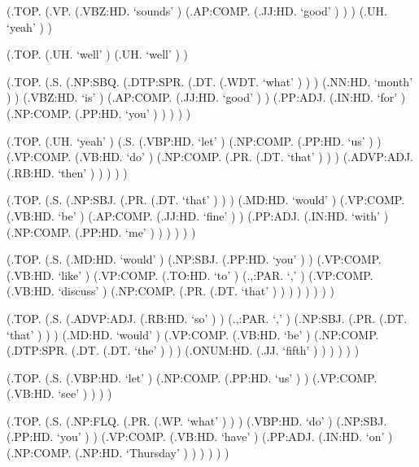 \documentclass[10pt]{article}
\begin{document}
\begin{parsetree}  (.TOP. (.VP. (.VBZ:HD. `sounds' ) (.AP:COMP. (.JJ:HD. `good' ) ) ) (.UH. `yeah' ) ) \end{parsetree}

\begin{parsetree}  (.TOP. (.UH. `well' ) (.UH. `well' ) ) \end{parsetree}

\begin{parsetree}  (.TOP. (.S. (.NP:SBQ. (.DTP:SPR. (.DT. (.WDT. `what' ) ) ) (.NN:HD. `month' ) ) (.VBZ:HD. `is' ) (.AP:COMP. (.JJ:HD. `good' ) ) (.PP:ADJ. (.IN:HD. `for' ) (.NP:COMP. (.PP:HD. `you' ) ) ) ) ) \end{parsetree}

\begin{parsetree}  (.TOP. (.UH. `yeah' ) (.S. (.VBP:HD. `let' ) (.NP:COMP. (.PP:HD. `us' ) ) (.VP:COMP. (.VB:HD. `do' ) (.NP:COMP. (.PR. (.DT. `that' ) ) ) (.ADVP:ADJ. (.RB:HD. `then' ) ) ) ) ) \end{parsetree}

\begin{parsetree}  (.TOP. (.S. (.NP:SBJ. (.PR. (.DT. `that' ) ) ) (.MD:HD. `would' ) (.VP:COMP. (.VB:HD. `be' ) (.AP:COMP. (.JJ:HD. `fine' ) ) (.PP:ADJ. (.IN:HD. `with' ) (.NP:COMP. (.PP:HD. `me' ) ) ) ) ) ) \end{parsetree}

\begin{parsetree}  (.TOP. (.S. (.MD:HD. `would' ) (.NP:SBJ. (.PP:HD. `you' ) ) (.VP:COMP. (.VB:HD. `like' ) (.VP:COMP. (.TO:HD. `to' ) (.,:PAR. `,' ) (.VP:COMP. (.VB:HD. `discuss' ) (.NP:COMP. (.PR. (.DT. `that' ) ) ) ) ) ) ) ) \end{parsetree}

\begin{parsetree}  (.TOP. (.S. (.ADVP:ADJ. (.RB:HD. `so' ) ) (.,:PAR. `,' ) (.NP:SBJ. (.PR. (.DT. `that' ) ) ) (.MD:HD. `would' ) (.VP:COMP. (.VB:HD. `be' ) (.NP:COMP. (.DTP:SPR. (.DT. (.DT. `the' ) ) ) (.ONUM:HD. (.JJ. `fifth' ) ) ) ) ) ) \end{parsetree}

\begin{parsetree}  (.TOP. (.S. (.VBP:HD. `let' ) (.NP:COMP. (.PP:HD. `us' ) ) (.VP:COMP. (.VB:HD. `see' ) ) ) ) \end{parsetree}

\begin{parsetree}  (.TOP. (.S. (.NP:FLQ. (.PR. (.WP. `what' ) ) ) (.VBP:HD. `do' ) (.NP:SBJ. (.PP:HD. `you' ) ) (.VP:COMP. (.VB:HD. `have' ) (.PP:ADJ. (.IN:HD. `on' ) (.NP:COMP. (.NP:HD. `Thursday' ) ) ) ) ) ) \end{parsetree}
\end{document}
